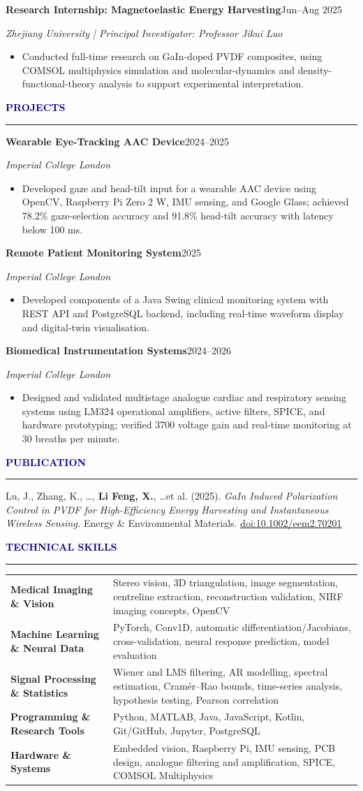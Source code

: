 \documentclass[10pt,a4paper]{article}
\newcommand{\sectiontitle}[1]{\par\vspace{3pt}\textcolor{navy}{\large\textbf{#1}}\par\vspace{-3pt}\textcolor{navy}{\rule{\linewidth}{0.45pt}}\vspace{0pt}}
\newcommand{\entry}[2]{\textbf{#1}\hfill{\color{black!65}#2}\par}
\begin{document}
\entry{Research Internship: Magnetoelastic Energy Harvesting}{Jun--Aug 2025}
\textit{Zhejiang University \quad | \quad Principal Investigator: Professor Jikui Luo}
\begin{itemize}
\item Conducted full-time research on GaIn-doped PVDF composites, using COMSOL multiphysics simulation and molecular-dynamics and density-functional-theory analysis to support experimental interpretation.
\end{itemize}
\sectiontitle{PROJECTS}
\entry{Wearable Eye-Tracking AAC Device}{2024--2025}
\textit{Imperial College London}
\begin{itemize}
\item Developed gaze and head-tilt input for a wearable AAC device using OpenCV, Raspberry Pi Zero 2 W, IMU sensing, and Google Glass; achieved 78.2\% gaze-selection accuracy and 91.8\% head-tilt accuracy with latency below 100 ms.
\end{itemize}
\entry{Remote Patient Monitoring System}{2025}
\textit{Imperial College London}
\begin{itemize}
\item Developed components of a Java Swing clinical monitoring system with REST API and PostgreSQL backend, including real-time waveform display and digital-twin visualisation.
\end{itemize}
\entry{Biomedical Instrumentation Systems}{2024--2026}
\textit{Imperial College London}
\begin{itemize}
\item Designed and validated multistage analogue cardiac and respiratory sensing systems using LM324 operational amplifiers, active filters, SPICE, and hardware prototyping; verified 3700 voltage gain and real-time monitoring at 30 breaths per minute.
\end{itemize}
\sectiontitle{PUBLICATION}
Lu, J., Zhang, K., \ldots, \textbf{Li Feng, X.}, \ldots et al. (2025). \textit{GaIn Induced Polarization Control in PVDF for High-Efficiency Energy Harvesting and Instantaneous Wireless Sensing.} Energy \& Environmental Materials. \href{https://doi.org/10.1002/eem2.70201}{doi:10.1002/eem2.70201}
\sectiontitle{TECHNICAL SKILLS}
\renewcommand{\arraystretch}{1.05}
\begin{tabularx}{\linewidth}{@{}>{\bfseries}p{3.05cm}X@{}}
Medical Imaging \& Vision & Stereo vision, 3D triangulation, image segmentation, centreline extraction, reconstruction validation, NIRF imaging concepts, OpenCV\\
Machine Learning \& Neural Data & PyTorch, Conv1D, automatic differentiation/Jacobians, cross-validation, neural response prediction, model evaluation\\
Signal Processing \& Statistics & Wiener and LMS filtering, AR modelling, spectral estimation, Cram\'er--Rao bounds, time-series analysis, hypothesis testing, Pearson correlation\\
Programming \& Research Tools & Python, MATLAB, Java, JavaScript, Kotlin, Git/GitHub, Jupyter, PostgreSQL\\
Hardware \& Systems & Embedded vision, Raspberry Pi, IMU sensing, PCB design, analogue filtering and amplification, SPICE, COMSOL Multiphysics
\end{tabularx}
\end{document}
